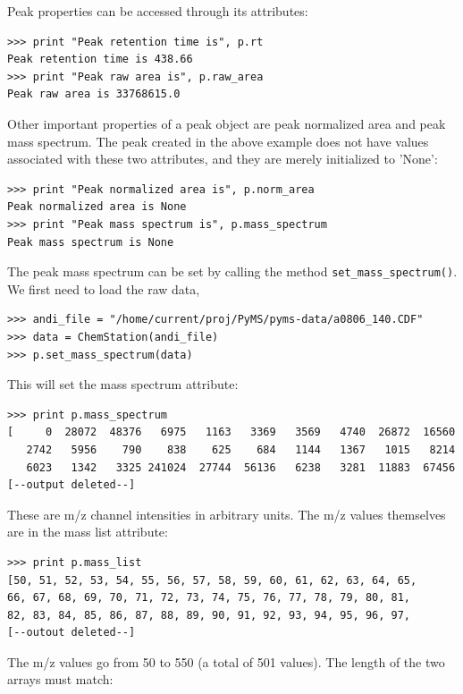 Peak properties can be accessed through its attributes:

\begin{verbatim}
>>> print "Peak retention time is", p.rt
Peak retention time is 438.66
>>> print "Peak raw area is", p.raw_area
Peak raw area is 33768615.0
\end{verbatim}

\noindent
Other important properties of a peak object are peak normalized area
and peak mass spectrum. The peak created in the above example does
not have values associated with these two attributes, and they are
merely initialized to 'None':

\begin{verbatim}
>>> print "Peak normalized area is", p.norm_area
Peak normalized area is None
>>> print "Peak mass spectrum is", p.mass_spectrum
Peak mass spectrum is None
\end{verbatim}

\noindent
The peak mass spectrum can be set by calling the method {\tt set\_mass\_spectrum()}.
We first need to load the raw data,

\begin{verbatim}
>>> andi_file = "/home/current/proj/PyMS/pyms-data/a0806_140.CDF"
>>> data = ChemStation(andi_file)
>>> p.set_mass_spectrum(data)
\end{verbatim}

\noindent
This will set the mass spectrum attribute: 

\begin{verbatim}
>>> print p.mass_spectrum
[     0  28072  48376   6975   1163   3369   3569   4740  26872  16560
   2742   5956    790    838    625    684   1144   1367   1015   8214
   6023   1342   3325 241024  27744  56136   6238   3281  11883  67456
[--output deleted--]
\end{verbatim}

\noindent
These are m/z channel intensities in arbitrary units. The m/z values
themselves are in the mass list attribute:

\begin{verbatim}
>>> print p.mass_list
[50, 51, 52, 53, 54, 55, 56, 57, 58, 59, 60, 61, 62, 63, 64, 65,
66, 67, 68, 69, 70, 71, 72, 73, 74, 75, 76, 77, 78, 79, 80, 81,
82, 83, 84, 85, 86, 87, 88, 89, 90, 91, 92, 93, 94, 95, 96, 97,
[--outout deleted--]
\end{verbatim}

\noindent
The m/z values go from 50 to 550 (a total of 501 values).  The length of
the two arrays must match:

